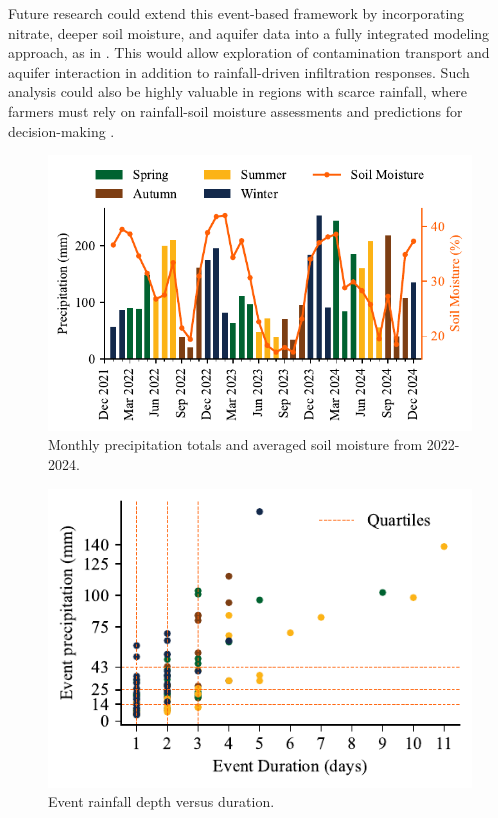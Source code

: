 \documentclass[9pt, twocolumn]{extarticle}
\begin{document}
Future research could extend this event-based framework by incorporating nitrate, deeper soil moisture, and aquifer data into a fully integrated modeling approach, as in \textcite{Fahs2025}. This would allow exploration of contamination transport and aquifer interaction in addition to rainfall-driven infiltration responses. Such analysis could also be highly valuable in regions with scarce rainfall, where farmers must rely on rainfall-soil moisture assessments and predictions for decision-making \cite{haghighi}.

\begin{figure}[!h] %
  \centering
  \includegraphics[width=1\columnwidth]{monthly_precip_sm}
  \caption{Monthly precipitation totals and averaged soil moisture from 2022-2024.}
  \label{fig:monthly_precip_sm}
\end{figure}

\begin{figure}[!h] %
  \centering
  \includegraphics[width=0.7\columnwidth]{rain events}
  \caption{Event rainfall depth versus duration.}
  \label{fig:rain_events}
\end{figure}
\end{document}
